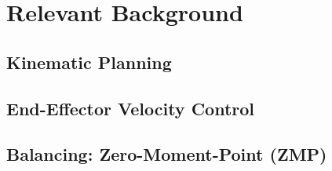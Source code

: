 			
			
			
			
			
			
			

		
	\section{Relevant Background}\label{sec:background}
    		
    	
		\subsection{Kinematic Planning}
			
		\subsection{End-Effector Velocity Control}
			
%			
		\subsection{Balancing: Zero-Moment-Point (ZMP)}\label{sec:zmp}
			
	

